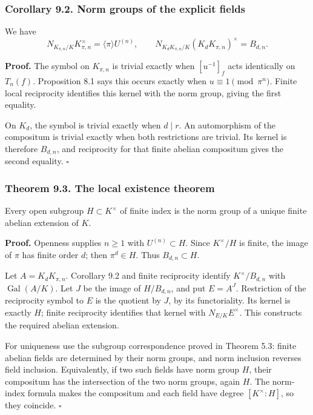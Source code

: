 \documentclass[11pt,a4paper]{article}
\begin{document}
\subsubsection{Corollary 9.2. Norm groups of the explicit
fields}\label{corollary-9.2.-norm-groups-of-the-explicit-fields}

We have \[
N_{K_{\pi,n}/K}K_{\pi,n}^\times
 =\langle\pi\rangle U^{(n)},\qquad
N_{K_dK_{\pi,n}/K}(K_dK_{\pi,n})^\times=B_{d,n}.
\tag{8}
\]

\textbf{Proof.} The symbol on \(K_{\pi,n}\) is trivial exactly when
\([u^{-1}]_f\) acts identically on \(T_n(f)\). Proposition 8.1 says this
occurs exactly when \(u\equiv1\pmod{\pi^n}\). Finite local reciprocity
identifies this kernel with the norm group, giving the first equality.

On \(K_d\), the symbol is trivial exactly when \(d\mid r\). An
automorphism of the compositum is trivial exactly when both restrictions
are trivial. Its kernel is therefore \(B_{d,n}\), and reciprocity for
that finite abelian compositum gives the second equality. \(\square\)

\subsubsection{Theorem 9.3. The local existence
theorem}\label{theorem-9.3.-the-local-existence-theorem}

Every open subgroup \(H\subset K^\times\) of finite index is the norm
group of a unique finite abelian extension of \(K\).

\textbf{Proof.} Openness supplies \(n\geq1\) with \(U^{(n)}\subset H\).
Since \(K^\times/H\) is finite, the image of \(\pi\) has finite order
\(d\); then \(\pi^d\in H\). Thus \(B_{d,n}\subset H\).

Let \(A=K_dK_{\pi,n}\). Corollary 9.2 and finite reciprocity identify
\(K^\times/B_{d,n}\) with \(\operatorname{Gal}(A/K)\). Let \(J\) be the
image of \(H/B_{d,n}\), and put \(E=A^J\). Restriction of the
reciprocity symbol to \(E\) is the quotient by \(J\), by its
functoriality. Its kernel is exactly \(H\); finite reciprocity
identifies that kernel with \(N_{E/K}E^\times\). This constructs the
required abelian extension.

For uniqueness use the subgroup correspondence proved in Theorem 5.3:
finite abelian fields are determined by their norm groups, and norm
inclusion reverses field inclusion. Equivalently, if two such fields
have norm group \(H\), their compositum has the intersection of the two
norm groups, again \(H\). The norm-index formula makes the compositum
and each field have degree \([K^\times:H]\), so they coincide.
\(\square\)
\end{document}
